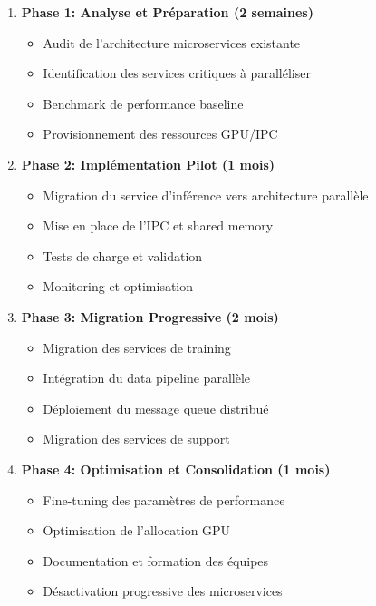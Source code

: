 \documentclass[12pt,a4paper]{article}
\begin{document}
\begin{enumerate}
    \item \textbf{Phase 1: Analyse et Préparation (2 semaines)}
    \begin{itemize}
        \item Audit de l'architecture microservices existante
        \item Identification des services critiques à paralléliser
        \item Benchmark de performance baseline
        \item Provisionnement des ressources GPU/IPC
    \end{itemize}
    
    \item \textbf{Phase 2: Implémentation Pilot (1 mois)}
    \begin{itemize}
        \item Migration du service d'inférence vers architecture parallèle
        \item Mise en place de l'IPC et shared memory
        \item Tests de charge et validation
        \item Monitoring et optimisation
    \end{itemize}
    
    \item \textbf{Phase 3: Migration Progressive (2 mois)}
    \begin{itemize}
        \item Migration des services de training
        \item Intégration du data pipeline parallèle
        \item Déploiement du message queue distribué
        \item Migration des services de support
    \end{itemize}
    
    \item \textbf{Phase 4: Optimisation et Consolidation (1 mois)}
    \begin{itemize}
        \item Fine-tuning des paramètres de performance
        \item Optimisation de l'allocation GPU
        \item Documentation et formation des équipes
        \item Désactivation progressive des microservices
    \end{itemize}
\end{enumerate}
\end{document}
